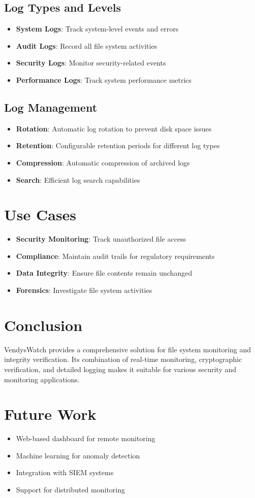 \documentclass[12pt]{article}
\begin{document}
\subsection{Log Types and Levels}
\begin{itemize}
    \item \textbf{System Logs}: Track system-level events and errors
    \item \textbf{Audit Logs}: Record all file system activities
    \item \textbf{Security Logs}: Monitor security-related events
    \item \textbf{Performance Logs}: Track system performance metrics
\end{itemize}

\subsection{Log Management}
\begin{itemize}
    \item \textbf{Rotation}: Automatic log rotation to prevent disk space issues
    \item \textbf{Retention}: Configurable retention periods for different log types
    \item \textbf{Compression}: Automatic compression of archived logs
    \item \textbf{Search}: Efficient log search capabilities
\end{itemize}

\section{Use Cases}
\begin{itemize}
    \item \textbf{Security Monitoring}: Track unauthorized file access
    \item \textbf{Compliance}: Maintain audit trails for regulatory requirements
    \item \textbf{Data Integrity}: Ensure file contents remain unchanged
    \item \textbf{Forensics}: Investigate file system activities
\end{itemize}

\section{Conclusion}
VendysWatch provides a comprehensive solution for file system monitoring and integrity verification. Its combination of real-time monitoring, cryptographic verification, and detailed logging makes it suitable for various security and monitoring applications.

\section{Future Work}
\begin{itemize}
    \item Web-based dashboard for remote monitoring
    \item Machine learning for anomaly detection
    \item Integration with SIEM systems
    \item Support for distributed monitoring
\end{itemize}
\end{document}

